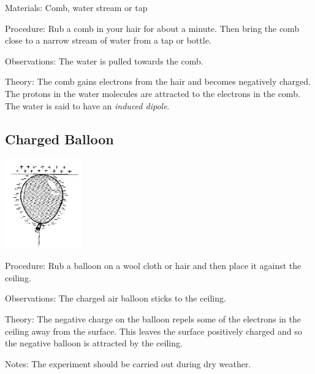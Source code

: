 \begin{multicols}{2}
\begin{description*}
\item[Materials:]{Comb, water stream or tap}
\item[Procedure:]{Rub a comb in your hair for about a minute. Then bring the comb close to a narrow stream of water from a tap or bottle.}
\item[Observations:]{The water is pulled towards the comb.}
\item[Theory:]{The comb gains electrons from the hair and becomes negatively charged. The protons in the water molecules are attracted to the electrons in the comb. The water is said to have an \emph{induced dipole}.}
\end{description*}

\subsection{Charged Balloon}

\begin{center}
\includegraphics[width=0.25\textwidth]{./img/source/charged-balloon.jpg}
\end{center}

\begin{description*}
\item[Procedure:]{Rub a balloon on a wool cloth or hair and then place it against the ceiling.}
\item[Observations:]{The charged air balloon sticks to the ceiling.}
\item[Theory:]{The negative charge on the balloon repels some of the electrons in
the ceiling away from the surface. This leaves the surface positively charged and so the
negative balloon is attracted by the ceiling.}
\item[Notes:]{The experiment should be carried out during dry weather.}
\end{description*}


\end{multicols}
